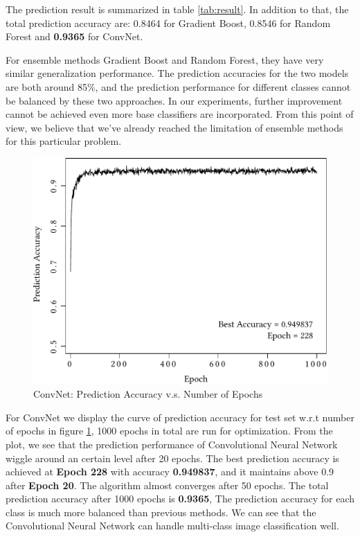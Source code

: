 \documentclass[11pt,oneside,a4paper]{article}
\numberwithin{equation}{section}
\begin{document}
The prediction result is summarized in table \ref{tab:result}. In addition to that, the total prediction accuracy are: 0.8464 for Gradient Boost, 0.8546 for Random Forest and \textbf{0.9365} for ConvNet.

For ensemble methods Gradient Boost and Random Forest, they have very similar generalization performance. The prediction accuracies for the two models are both around 85\%, and the prediction performance for different classes cannot be balanced by these two approaches. In our experiments, further improvement cannot be achieved even more base classifiers are incorporated. From this point of view, we believe that we've already reached the limitation of ensemble methods for this particular problem.

\begin{figure}[ht!]
\centering
\includegraphics[width=0.6\linewidth]{convnet-pred-acc.pdf}
\caption{ConvNet: Prediction Accuracy v.s. Number of Epochs}
\label{fig:cnn}
\end{figure}

For ConvNet we display the curve of prediction accuracy for test set w.r.t number of epochs in figure \ref{fig:cnn}, 1000 epochs in total are run for optimization. From the plot, we see that the prediction performance of Convolutional Neural Network wiggle around an certain level after 20 epochs. The best prediction accuracy is achieved at \textbf{Epoch 228} with accuracy \textbf{0.949837}, and it maintains above 0.9 after \textbf{Epoch 20}. The algorithm almost converges after 50 epochs. The total prediction accuracy after 1000 epochs is \textbf{0.9365}, The prediction accuracy for each class is much more balanced than previous methods. We can see that the Convolutional Neural Network can handle multi-class image classification well.
\end{document}
